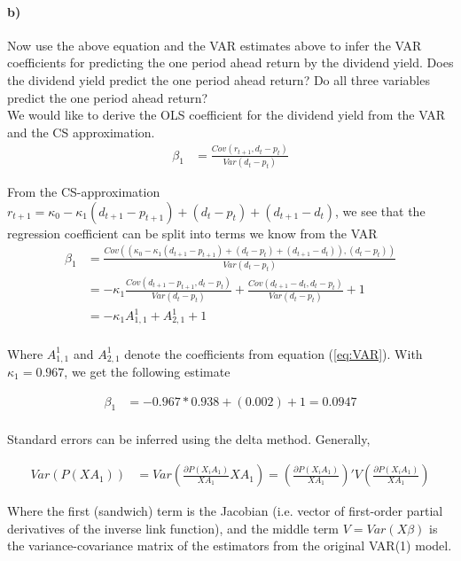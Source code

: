 \documentclass[11pt,letter]{article}
\begin{document}
\paragraph{b)} Now use the above equation and the VAR estimates above to infer the VAR coefficients for predicting the one period ahead return by the dividend yield. Does the dividend yield predict the one period ahead return? Do all three variables predict the one period ahead return?\\


We would like to derive the OLS coefficient for the dividend yield from the VAR and the CS approximation. 
\begin{align*}
\beta_1 &= \frac{Cov(r_{t+1},d_t-p_t)}{Var(d_t-p_t)}
\end{align*}

From the CS-approximation $r_{t+1}=\kappa_0-\kappa_1 (d_{t+1}-p_{t+1}) + (d_t-p_t) + (d_{t+1}-d_t)$, we see that the regression coefficient can be split into terms we know from the VAR
\\
\begin{align*}
\beta_1 &= \frac{Cov((\kappa_0 - \kappa_1 (d_{t+1}-p_{t+1})+ (d_t-p_t) + (d_{t+1}-d_t)),(d_t-p_t))}{Var(d_t-p_t)}\\
&= -\kappa_1 \frac{Cov(d_{t+1}-p_{t+1},d_t-p_t)}{Var(d_t-p_t)} +\frac{Cov(d_{t+1}-d_{t},d_t-p_t)}{Var(d_t-p_t)}+1\\
&= -\kappa_1 A^1_{1,1} + A^1_{2,1} + 1\\
\end{align*}

Where $A^1_{1,1}$ and $A^1_{2,1}$ denote the coefficients from equation (\ref{eq:VAR}). With $\kappa_1=0.967$, we get the following estimate

\begin{align*}
\beta_1 &= -0.967 * 0.938 + (0.002) + 1 = 0.0947\\
\end{align*}

Standard errors can be inferred using the delta method. Generally,

\begin{align*}
Var(P(X A_1)) &= Var( \frac{\partial P(X_i A_1)}{X A_1} X A_1) = (\frac{\partial P(X_i A_1)}{X A_1})' V (\frac{\partial P(X_i A_1)}{X A_1})
\end{align*}

Where the first (sandwich) term is the Jacobian (i.e. vector of first-order partial derivatives of the inverse link function), and the middle term $V=Var(X\beta)$ is the variance-covariance matrix of the estimators from the original VAR(1) model.  
\end{document}
